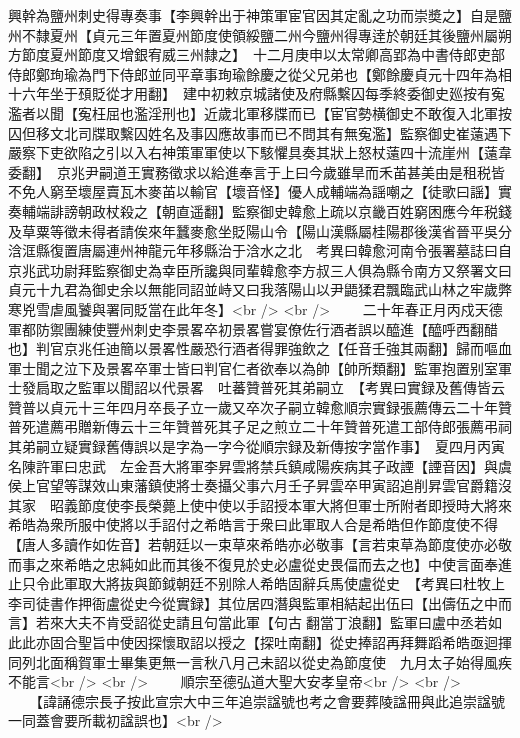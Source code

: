 興幹為鹽州刺史得專奏事【李興幹出于神策軍宦官因其定亂之功而崇奬之】自是鹽州不隸夏州【貞元三年置夏州節度使領綏鹽二州今鹽州得專逹於朝廷其後鹽州屬朔方節度夏州節度又增銀宥威三州隸之】　十二月庚申以太常卿高郢為中書侍郎吏部侍郎鄭珣瑜為門下侍郎並同平章事珣瑜餘慶之從父兄弟也【鄭餘慶貞元十四年為相十六年坐于䪹貶從才用翻】　建中初敕京城諸使及府縣繫囚每季終委御史廵按有寃濫者以聞【寃枉屈也濫淫刑也】近歲北軍移牒而已【宦官勢横御史不敢復入北軍按囚但移文北司牒取繫囚姓名及事囚應故事而已不問其有無寃濫】監察御史崔薳遇下嚴察下吏欲陷之引以入右神策軍軍使以下駭懼具奏其狀上怒杖薳四十流崖州【薳韋委翻】　京兆尹嗣道王實務徵求以給進奉言于上曰今歲雖旱而禾苖甚美由是租税皆不免人窮至壞屋賣瓦木麥苖以輸官【壞音怪】優人成輔端為謡嘲之【徒歌曰謡】實奏輔端誹謗朝政杖殺之【朝直遥翻】監察御史韓愈上疏以京畿百姓窮困應今年税錢及草粟等徵未得者請俟來年蠶麥愈坐貶陽山令【陽山漢縣屬桂陽郡後漢省晉平吳分浛洭縣復置唐屬連州神龍元年移縣治于浛水之北　考異曰韓愈河南令張署墓誌曰自京兆武功尉拜監察御史為幸臣所讒與同輩韓愈李方叔三人俱為縣令南方又祭署文曰貞元十九君為御史余以無能同詔並峙又曰我落陽山以尹鼯猱君飄臨武山林之牢歲弊寒兇雪虐風饕與署同貶當在此年冬】<br />
<br />
　　二十年春正月丙戍天德軍都防禦團練使豐州刺史李景畧卒初景畧嘗宴僚佐行酒者誤以醯進【醯呼西翻醋也】判官京兆任迪簡以景畧性嚴恐行酒者得罪強飲之【任音壬強其兩翻】歸而嘔血軍士聞之泣下及景畧卒軍士皆曰判官仁者欲奉以為帥【帥所類翻】監軍抱置别室軍士發扃取之監軍以聞詔以代景畧　吐蕃贊普死其弟嗣立　【考異曰實録及舊傳皆云贊普以貞元十三年四月卒長子立一歲又卒次子嗣立韓愈順宗實録張薦傳云二十年贊普死遣薦弔贈新傳云十三年贊普死其子足之煎立二十年贊普死遣工部侍郎張薦弔祠其弟嗣立疑實録舊傳誤以是字為一字今從順宗録及新傳按字當作事】　夏四月丙寅名陳許軍曰忠武　左金吾大將軍李昇雲將禁兵鎮咸陽疾病其子政諲【諲音因】與虞侯上官望等謀效山東藩鎮使將士奏攝父事六月壬子昇雲卒甲寅詔追削昇雲官爵籍沒其家　昭義節度使李長榮薨上使中使以手詔授本軍大將但軍士所附者即授時大將來希皓為衆所服中使將以手詔付之希皓言于衆曰此軍取人合是希皓但作節度使不得【唐人多讀作如佐音】若朝廷以一束草來希皓亦必敬事【言若束草為節度使亦必敬而事之來希皓之忠純如此而其後不復見於史必盧從史畏偪而去之也】中使言面奉進止只令此軍取大將抜與節鉞朝廷不别除人希皓固辭兵馬使盧從史　【考異曰杜牧上李司徒書作押衙盧從史今從實録】其位居四潛與監軍相結起出伍曰【出儔伍之中而言】若來大夫不肯受詔從史請且句當此軍【句古翻當丁浪翻】監軍曰盧中丞若如此此亦固合聖旨中使因探懷取詔以授之【探吐南翻】從史捧詔再拜舞蹈希皓亟迴揮同列北面稱賀軍士畢集更無一言秋八月己未詔以從史為節度使　九月太子始得風疾不能言<br />
<br />
　　順宗至德弘道大聖大安孝皇帝<br />
<br />
　　【諱誦德宗長子按此宣宗大中三年追崇諡號也考之會要葬陵諡冊與此追崇諡號一同蓋會要所載初諡誤也】<br />
